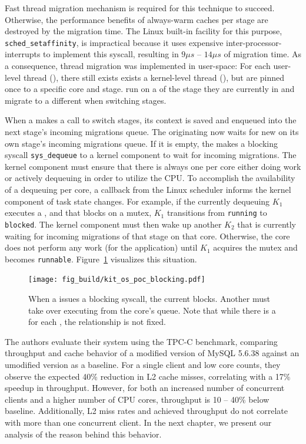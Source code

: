 \documentclass[12pt,a4paper]{book}
\begin{document}
Fast thread migration mechanism is required for this technique to succeed.
Otherwise, the performance benefits of always-warm caches per stage are destroyed by the migration time.
The Linux built-in facility for this purpose, \texttt{sched\_setaffinity}, is impractical because it uses
expensive inter-processor-interrupts to implement this syscall, resulting in $9\mu s$ -- $14\mu s$ of migration time.
As a consequence, thread migration was implemented in user-space:
For each user-level thread (\ult), there still exists exists a kernel-level thread (\klt),
but \klts are pinned once to a specific core and stage.
\ults run on a \klt of the stage they are currently in and migrate to a different \klt when switching stages.~\cite{sodaspr}%

When a \ult makes a call to switch stages, its context is saved and enqueued into the next stage's incoming migrations queue.
The originating \klt now waits for new \ults on its own stage's incoming migrations queue.
If it is empty, the \klt makes a blocking syscall \texttt{sys\_dequeue} to a kernel component to wait for incoming migrations.
The kernel component must ensure that there is always one \klt per core either doing work or actively dequeuing \ults in order to utilize the CPU.
To accomplish the availability of a dequeuing \klt per core, a callback from the Linux scheduler informs the kernel component of task state changes.
For example, if the currently dequeuing \klt $K_1$ executes a \ult, and that \ult blocks on a mutex, $K_1$ transitions from \texttt{running} to \texttt{blocked}.
The kernel component must then wake up another \klt $K_2$ that is currently waiting for incoming migrations of that stage on that core.
Otherwise, the core does not perform any work (for the application) until $K_1$ acquires the mutex and becomes \texttt{runnable}.
Figure~\ref{fig:kit_os_poc_blocking} visualizes this situation.

\begin{figure}[h]
    \centering
    \texttt{[image: fig\_build/kit\_os\_poc\_blocking.pdf]}
    \caption{When a \ult issues a blocking syscall, the current \klt blocks. Another \klt must take over executing \ults from the core's queue. Note that while there is a \klt for each \ult, the relationship is not fixed.}
    \label{fig:kit_os_poc_blocking}
\end{figure}

The authors evaluate their system using the TPC-C benchmark, comparing throughput and cache behavior of a modified version of MySQL 5.6.38 against an umodified version as a baseline.
For a single client and low core counts, they observe the expected 40\% reduction in L2 cache misses, correlating with a 17\% speedup in throughput.
However, for both an increased number of concurrent clients and a higher number of CPU cores, throughput is 10 -- 40\% below baseline.
Additionally, L2 miss rates and achieved throughput do not correlate with more than one concurrent client.
In the next chapter, we present our analysis of the reason behind this behavior.
\end{document}
